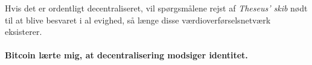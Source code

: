 Hvis det er ordentligt decentraliseret, vil spørgsmålene rejst af \textit{Theseus' 
skib} nødt til at blive besvaret i al evighed, så længe disse værdioverførselsnetværk 
eksisterer.

\paragraph{Bitcoin lærte mig, at decentralisering modsiger identitet.}

%
%
%
%

